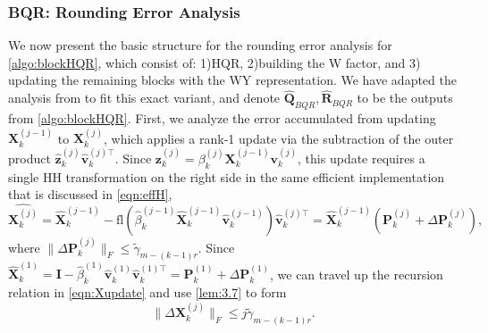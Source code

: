 \documentclass[review,onefignum,onetabnum]{siamart190516}
\newcommand{\bb}[1]{\mathbf{#1}}
\newcommand{\fl}{\mathrm{fl}}
\begin{document}
\subsubsection{BQR: Rounding Error Analysis}\label{sec:BQRerr}
We now present the basic structure for the rounding error analysis for \cref{algo:blockHQR}, which consist of: 1)HQR, 2)building the W factor, and 3) updating the remaining blocks with the WY representation.
We have adapted the analysis from \cite{Higham2002} to fit this exact variant, and denote $\hat{\bb{Q}}_{BQR},\hat{\bb{R}}_{BQR}$ to be the outputs from \cref{algo:blockHQR}.
First, we analyze the error accumulated from updating $\bb{X}_k^{(j-1)}$ to $\bb{X}_k^{(j)}$, which applies a rank-1 update via the subtraction of the outer product $\hat{\bb{z}}_{k}^{(j)}\hat{\bb{v}}_{k}^{(j)\top}$.
Since $\bb{z}_{k}^{(j)} = \beta_k^{(j)}\bb{X}_{k}^{(j-1)}\bb{v}_{k}^{(j)}$, this update requires a single HH transformation on the right side in the same efficient implementation that is discussed in \cref{eqn:effH},
\begin{equation}
\hat{\bb{X}_k^{(j)}} = 
\hat{\bb{X}}_k^{(j-1)} - \fl(\hat{\beta}_k^{(j-1)}\hat{\bb{X}}_k^{(j-1)}\hat{\bb{v}}_k^{(j-1)})\hat{\bb{v}}_k^{(j)\top} = \hat{\bb{X}}_k^{(j-1)}(\bb{P}_k^{(j)}+\Delta \bb{P}_k^{(j)}), \label{eqn:Xupdate}
\end{equation}
where $\|\Delta \bb{P}_k^{(j)}\|_F \leq \tilde{\gamma}_{m-(k-1)r}$.
Since $\hat{\bb{X}}_k^{(1)} = \bb{I} - \hat{\beta}_k^{(1)}\hat{\bb{v}}_k^{(1)}\hat{\bb{v}}_k^{(1)\top} = \bb{P}_k^{(1)} + \Delta \bb{P}_k^{(1)}$, we can travel up the recursion relation in \cref{eqn:Xupdate} and use \cref{lem:3.7} to form
\begin{equation}
\|\Delta \bb{X}_k^{(j)} \|_F \leq j\tilde{\gamma}_{m-(k-1)r}. \label{eqn:deltX}
\end{equation}
\end{document}
